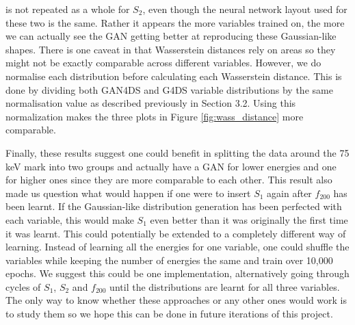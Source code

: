 \documentclass[11pt]{article} %
\begin{document}
is not repeated as a whole for $S_2$, even though the neural network layout used for these two is the same.
Rather it appears the more variables trained on, the more we can actually see the GAN
getting better at reproducing these Gaussian-like shapes.
There is one caveat in that Wasserstein distances rely on areas so they might not be exactly comparable across different variables.
However, we do normalise each distribution before calculating each Wasserstein distance.
This is done by dividing both GAN4DS and G4DS variable distributions by the same normalisation value as described previously in Section 3.2.
Using this normalization makes the three plots in Figure \ref{fig:wass_distance} more comparable.
\\
\par Finally, these results suggest one could benefit in splitting the data around the 75 keV mark into two groups and actually
have a GAN for lower energies and one for higher ones since they are more comparable to each other.
This result also made us question what would happen if one were to insert $S_1$ again after $f_{200}$ has been learnt.
If the Gaussian-like distribution generation has been perfected with each variable, this would make $S_1$ even better than it was originally the first
time it was learnt.
This could potentially be extended to a completely different way of learning.
Instead of learning all the energies for one variable, one could shuffle the variables while keeping the number of energies the same and train over 10,000 epochs.
We suggest this could be one implementation, alternatively going through cycles of $S_1$, $S_2$ and $f_{200}$ until the distributions are
learnt for all three variables.
The only way to know whether these approaches or any other ones would work is to study them
so we hope this can be done in future iterations of this project.
\end{document}
